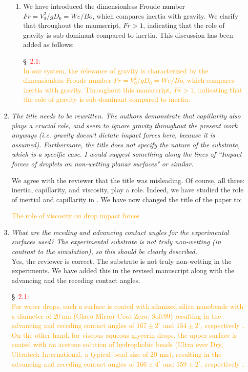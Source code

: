 \documentclass[]{article}
\newcommand*\red{\textcolor{red}}
\newcommand{\VS}[1]{{\textcolor{orange}{#1}}}
\begin{document}
\begin{enumerate}
\begin{enumerate}
		\item We have introduced the dimensionless Froude number $Fr = V_0^2/gD_0 = We/Bo$, which compares inertia with gravity. We clarify that throughout the manuscript, $Fr > 1$, indicating that the role of gravity is sub-dominant compared to inertia. This discussion has been added as follows:
		
		\S~\red{2.1:}\\
		\VS{In our system, the relevance of gravity is characterized by the dimensionless Froude number $Fr = V_0^2/gD_0 = We/Bo$, which compares inertia with gravity. Throughout this manuscript, $Fr > 1$, indicating that the role of gravity is sub-dominant compared to inertia.}
	\end{enumerate}
	
	\item \textit{The title needs to be rewritten. The authors demonstrate that capillarity also plays a crucial role, and seem to ignore gravity throughout the present work anyways (i.e. gravity doesn’t dictate impact forces here, because it is assumed). Furthermore, the title does not specify the nature of the substrate, which is a specific case. I would suggest something along the lines of ``Impact forces of droplets on non-wetting planar surfaces" or similar.}
	
	We agree with the reviewer that the title was misleading. Of course, all three: inertia, capillarity, and viscosity, play a role. Indeed, we have studied the role of inertial and capillarity in \citet{zhang2022impact}. We have now changed the title of the paper to:
	
	\VS{The role of viscosity on drop impact forces}
	
	\item \textit{What are the receding and advancing contact angles for the experimental surfaces used? The experimental substrate is not truly non-wetting (in contrast to the simulation), so this should be clearly described.}\\[0.5mm]
	
	Yes, the reviewer is correct. The substrate is not truly non-wetting in the experiments. We have added this in the revised manuscript along with the advancing and the receding contact angles. 
	
	\S~\red{2.1:}\\
	 \VS{For water drops, such a surface is coated with silanized silica nanobeads with a diameter of $20\,\si{\nano\meter}$ (Glaco Mirror Coat Zero; Soft99) resulting in the advancing and receding contact angles of $167 \pm 2^{\circ}$ and $154 \pm 2^{\circ}$, respectively \citep{Gauthier2015, Li2017}. On the other hand, for viscous aqueous glycerin drops, the upper surface is coated with an acetone solution of hydrophobic beads (Ultra ever Dry, Ultratech International, a typical bead size of 20 nm), resulting in the advancing and receding contact angles of $166 \pm 4^{\circ}$ and $159 \pm 2^{\circ}$, respectively \citep{Jha2020}.}
	

\end{enumerate}
\end{document}
